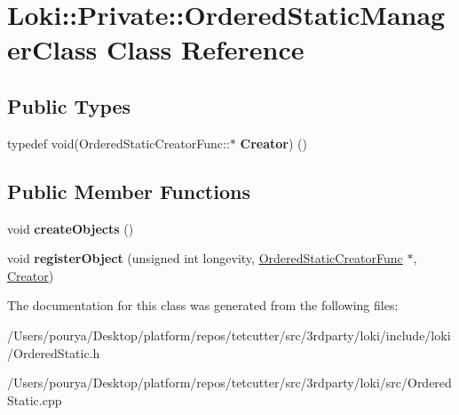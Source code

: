 \hypertarget{classLoki_1_1Private_1_1OrderedStaticManagerClass}{}\section{Loki\+:\+:Private\+:\+:Ordered\+Static\+Manager\+Class Class Reference}
\label{classLoki_1_1Private_1_1OrderedStaticManagerClass}
\subsection*{Public Types}
\begin{DoxyCompactItemize}
\item 
\hypertarget{classLoki_1_1Private_1_1OrderedStaticManagerClass_a523d6db1ca416738b7973ef870012356}{}typedef void(Ordered\+Static\+Creator\+Func\+::$\ast$ {\bfseries Creator}) ()\label{classLoki_1_1Private_1_1OrderedStaticManagerClass_a523d6db1ca416738b7973ef870012356}

\end{DoxyCompactItemize}
\subsection*{Public Member Functions}
\begin{DoxyCompactItemize}
\item 
\hypertarget{classLoki_1_1Private_1_1OrderedStaticManagerClass_a52a1e59a234418cec653402e1d39ab4a}{}void {\bfseries create\+Objects} ()\label{classLoki_1_1Private_1_1OrderedStaticManagerClass_a52a1e59a234418cec653402e1d39ab4a}

\item 
\hypertarget{classLoki_1_1Private_1_1OrderedStaticManagerClass_a4d445462190e48472c8b7fd79af957cb}{}void {\bfseries register\+Object} (unsigned int longevity, \hyperlink{classLoki_1_1Private_1_1OrderedStaticCreatorFunc}{Ordered\+Static\+Creator\+Func} $\ast$, \hyperlink{classCreator}{Creator})\label{classLoki_1_1Private_1_1OrderedStaticManagerClass_a4d445462190e48472c8b7fd79af957cb}

\end{DoxyCompactItemize}


The documentation for this class was generated from the following files\+:\begin{DoxyCompactItemize}
\item 
/\+Users/pourya/\+Desktop/platform/repos/tetcutter/src/3rdparty/loki/include/loki/Ordered\+Static.\+h\item 
/\+Users/pourya/\+Desktop/platform/repos/tetcutter/src/3rdparty/loki/src/Ordered\+Static.\+cpp\end{DoxyCompactItemize}
